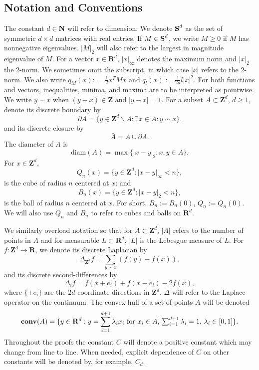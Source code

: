 \documentclass[12pt]{amsart}
\newcommand{\R}{\mathbf{R}}
\newcommand{\Z}{\mathbf{Z}}
\newcommand{\N}{\mathbf{N}}
\newcommand{\symm}{{\mbox{\bf S}}}  %
\newcommand{\diam}{{\mbox{diam}}}  %
\newcommand{\conv}{\mathop{\bf conv}}
\begin{document}
\subsection{Notation and Conventions} 
The constant $d \in \N$ will refer to dimension.
We denote $\symm^d$ as the set of symmetric $d \times d$ matrices with real entries. If $M \in \symm^d$, we write $M \geq 0$ if $M$ has nonnegative eigenvalues.  $|M|_2$ will also refer to the largest in magnitude eigenvalue of $M$. 
 For a vector $x \in \R^d$, $|x|_\infty$ denotes the maximum norm and $|x|_2$ the 2-norm. We sometimes omit the subscript, in which case $|x|$ refers to the 2-norm. We also write $q_M(x) : =  \frac{1}{2} x^T M x$ and $q_l(x) :=  \frac{1}{2d} l |x|^2$. For both functions and vectors, inequalities, minima, and maxima are to be interpreted as pointwise. We write $y \sim x$ when $(y - x) \in \Z$ and $|y-x| = 1$. 
For a subset $A \subset \Z^d$, $d \geq 1$, denote its discrete boundary by 
\[
\partial A = \{ y \in \Z^d \backslash A : \exists x \in A: y \sim x \}. 
\]
and its discrete closure by 
\[
\bar{A} = A \cup \partial A. 
\]
The diameter of $A$ is 
\[
\diam(A) = \max\{ |x-y|_2 : x,y \in A\}.
\]
For $x \in \Z^d$,
\[
Q_n(x) = \{ y \in \Z^d : |x-y|_\infty  < n \}, 
\]
is the cube of radius $n$ centered at $x$:  
and 
\[
B_n(x) = \{y \in \Z^d: |x - y|_2 < n\}, 
\]
is the ball of radius $n$ centered at $x$. For short, $B_n := B_n(0)$, $Q_n := Q_n(0)$.  We will also use $Q_n$ and $B_n$
to refer to cubes and balls on $\R^d$.

We similarly overload notation so that for $A \subset \Z^d$, $|A|$ refers to the number of points in $A$ and for measurable $L \subset \R^d$, $|L|$ is the Lebesgue measure of $L$. For $f: \Z^d \to \R$, we denote its discrete Laplacian by  
\[
\Delta_{\Z^d} f = \sum_{y \sim x} ( f(y) - f(x)), 
\]
and its discrete second-differences by
\[
\Delta_i f = f(x+e_i) + f(x-e_i) - 2 f(x), 
\]
where $\{ \pm e_i\}$  are the $2 d$ coordinate directions in $\Z^d$.   $\Delta$ will refer to the Laplace operator on the continuum.  The convex hull of a set of points $A$ will be denoted 
\[
\conv(A) = \{y \in \R^d:  y = \sum_{i=1}^{d+1} \lambda_i x_i \mbox{ for $x_i \in A$, $\sum_{i=1}^{d+1} \lambda_i  = 1$, $\lambda_i \in [0,1]$}\}.
\]
Throughout the proofs the constant $C$ will denote a positive constant which may change from line to line. When needed, explicit dependence of 
$C$ on other constants will be denoted by, for example, $C_d$.

\end{document}
